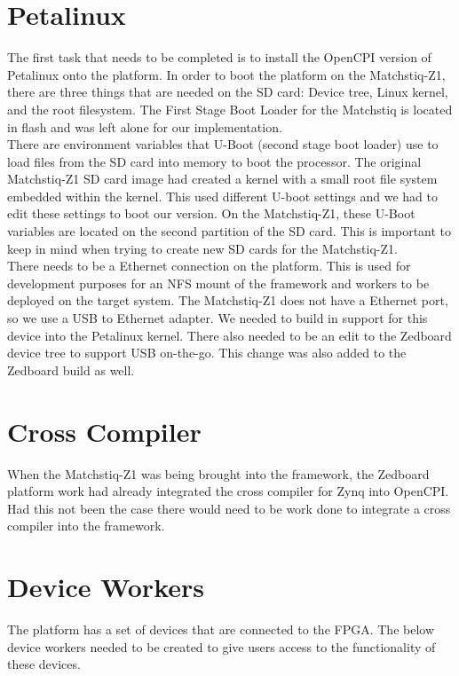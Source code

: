 \documentclass{article}
\begin{document}
\section*{Petalinux}

  The first task that needs to be completed is to install the OpenCPI version of Petalinux onto the platform.  In order to boot the platform on the Matchstiq-Z1, there are three things that are needed on the SD card: Device tree, Linux kernel, and the root filesystem.  The First Stage Boot Loader for the Matchstiq is located in flash and was left alone for our implementation.\\

  \noindent There are environment variables that U-Boot (second stage boot loader) use to load files from the SD card into memory to boot the processor.  The original Matchstiq-Z1 SD card image had created a kernel with a small root file system embedded within the kernel. This used different U-boot settings and we had to edit these settings to boot our version. On the Matchstiq-Z1, these U-Boot variables are located on the second partition of the SD card. This is important to keep in mind when trying to create new SD cards for the Matchstiq-Z1.  \\

  \noindent There needs to be a Ethernet connection on the platform.  This is used for development purposes for an NFS mount of the framework and workers to be deployed on the target system.  The Matchstiq-Z1 does not have a Ethernet port, so we use a USB to Ethernet adapter.  We needed to build in support for this device into the Petalinux kernel.  There also needed to be an edit to the Zedboard device tree to support USB on-the-go.  This change was also added to the Zedboard build as well.

\section*{Cross Compiler}

  When the Matchstiq-Z1 was being brought into the framework, the Zedboard platform work had already integrated the cross compiler for Zynq into OpenCPI.  Had this not been the case there would need to be work done to integrate a cross compiler into the framework.

\section*{Device Workers}
  The platform has a set of devices that are connected to the FPGA.  The below device workers needed to be created to give users access to the functionality of these devices.
\end{document}
